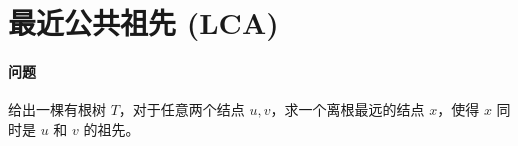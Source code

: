\section{最近公共祖先 (LCA)}
	\paragraph{问题} 给出一棵有根树 $T$，对于任意两个结点 $u,v$，求一个离根最远的结点 $x$，使得 $x$ 同时是 $u$ 和 $v$ 的祖先。
	
    
    
    
